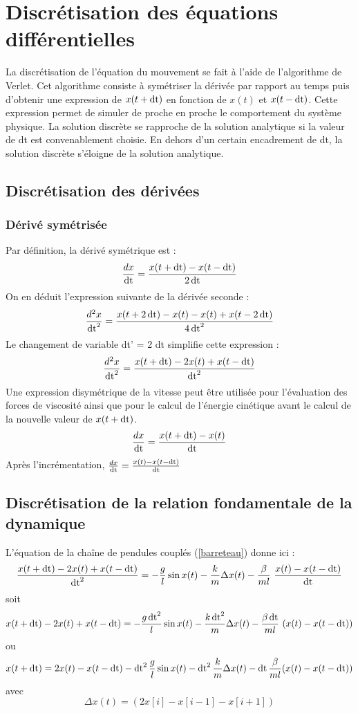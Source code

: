 
\section{Discrétisation des équations différentielles}
%
La discrétisation de l'équation du mouvement se fait à l'aide de l'algorithme de Verlet. Cet algorithme consiste à symétriser la dérivée par rapport au temps puis d'obtenir une expression de $x(t+\operatorname{dt})$ en fonction de $x(t)$ et $x(t-\operatorname{dt})$. Cette expression permet de simuler de proche en proche le comportement du système physique. La solution discrète se rapproche de la solution analytique si la valeur de dt est convenablement choisie. En dehors d'un certain encadrement de dt, la solution discrète s'éloigne de la solution analytique.
%
\subsection{Discrétisation des dérivées}
%
\subsubsection{Dérivé symétrisée}
Par définition, la dérivé symétrique est :
\[
\frac{dx}{\operatorname{dt}}=\frac{x(t+\operatorname{dt})-x(t-\operatorname{dt})}{2\operatorname{dt}}
\]
On en déduit l'expression suivante de la dérivée seconde :
\[
\frac{d^2x}{\operatorname{dt}^2}=\frac{x(t+2\operatorname{dt})-x(t)-x(t)+x(t-2\operatorname{dt})}{4\operatorname{dt}^2}
\]
Le changement de variable dt' = 2 dt simplifie cette expression :
\[
\frac{d^2x}{\operatorname{dt}^2}=\frac{x(t+\operatorname{dt})-2x(t)+x(t-\operatorname{dt})}{\operatorname{dt}^2}
\]
Une expression disymétrique de la vitesse peut être utilisée pour l'évaluation des forces de viscosité ainsi que pour le calcul de l'énergie cinétique avant le calcul de la nouvelle valeur de $x(t+\operatorname{dt})$.
\[
\frac{dx}{\operatorname{dt}}=\frac{x(t+\operatorname{dt})-x(t)}{\operatorname{dt}}
\]
{\footnotesize Après l'incrémentation, } $\frac{dx}{\operatorname{dt}}=\frac{x(t)-x(t-\operatorname{dt})}{\operatorname{dt}}$
%
\subsection{Discrétisation de la relation fondamentale de la dynamique}
%
L'équation de la chaîne de pendules couplés (\ref{barreteau}) donne ici :
%
\[
\frac{x(t+\operatorname{dt}) - 2x(t) + x(t-\operatorname{dt})}{\operatorname{dt}^2} = - \frac{g}{l} \sin{x(t)}  -  \frac{k}{m} \Delta x(t)  -  \frac{\beta}{ml}\ \frac{x(t) - x(t-\operatorname{dt})}{\operatorname{dt}}
\]
soit
\[
x(t+\operatorname{dt}) - 2x(t) + x(t-\operatorname{dt}) = - \frac{g\operatorname{dt}^2}{l} \sin{x(t)}  -  \frac{k\operatorname{dt}^2}{m} \Delta x(t)  -  \frac{\beta \operatorname{dt}}{ml}\ (x(t) - x(t-\operatorname{dt}))
\]
ou
\[
x(t+\operatorname{dt}) = 2x(t) - x(t-\operatorname{dt}) - \operatorname{dt}^2\frac{g}{l}\sin{x(t)}-\operatorname{dt}^2\frac{k}{m} \Delta x(t) - \operatorname{dt}\frac{\beta}{ml}(x(t)-x(t-\operatorname{dt}))
\]
avec
\[
\Delta x(t) = (2x[i]-x[i-1]-x[i+1])
\]

